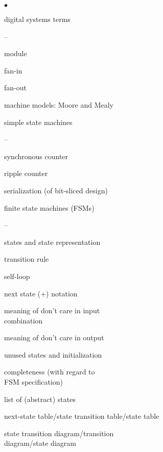 \begin{minipage}[t]{2.75in}
\begin{list}{$\bullet$}{\setlength{\itemsep}{0pt}\setlength{\parskip}{0pt}%
\setlength{\topsep}{0pt}\setlength{\partopsep}{0pt}\setlength{\parsep}{0pt}}

\item{digital systems terms
\begin{list}{--}{\setlength{\itemsep}{0pt}\setlength{\parskip}{0pt}%
\setlength{\topsep}{0pt}\setlength{\partopsep}{0pt}\setlength{\parsep}{0pt}}
\item module
\item fan-in
\item fan-out
\item machine models: Moore and Mealy
\end{list}
}

\item{simple state machines
\begin{list}{--}{\setlength{\itemsep}{0pt}\setlength{\parskip}{0pt}%
\setlength{\topsep}{0pt}\setlength{\partopsep}{0pt}\setlength{\parsep}{0pt}}
\item synchronous counter
\item ripple counter
\item serialization (of bit-sliced design)
\end{list}
}

\item{finite state machines (FSMs)
\begin{list}{--}{\setlength{\itemsep}{0pt}\setlength{\parskip}{0pt}%
\setlength{\topsep}{0pt}\setlength{\partopsep}{0pt}\setlength{\parsep}{0pt}}
\item states and state representation
\item transition rule
\item self-loop
\item next state (+) notation
\item meaning of don't care in input \\ combination
\item meaning of don't care in output
\item unused states and initialization
\item completeness (with regard to \\ FSM specification)
\item list of (abstract) states
\item next-state table/state transition table/state table
\item state transition diagram/transition \\ diagram/state diagram
\end{list}
}


\end{list}
\end{minipage}
